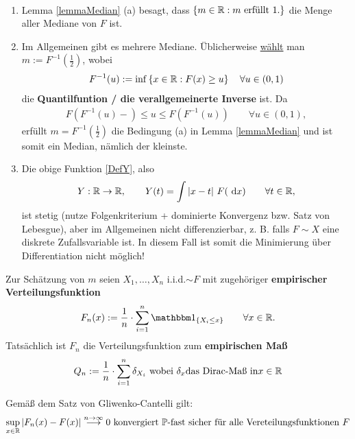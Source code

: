 \begin{bemerkungnr}\
\begin{enumerate}
\item Lemma \ref{lemmaMedian} (a) besagt, dass $\lbrace m\in\mathbb{R}: m\text{ erfüllt } 1.\rbrace$ die Menge aller Mediane von $F$ ist.
\item Im Allgemeinen gibt es mehrere Mediane. Üblicherweise \underline{wählt} man $m:=F^{-1}(\frac{1}{2})$, wobei
\begin{align*}
F^{-1}(u):=\inf\left\lbrace x\in\mathbb{R}:F(x)\geq u\right\rbrace\quad\forall u\in (0,1)
\end{align*}
die \textbf{Quantilfuntion / die verallgemeinerte Inverse} ist. Da
\begin{align*}
F\left(F^{-1}(u)-\right)\leq u\leq F\left(F^{-1}(u)\right)\qquad\forall u\in (0,1),
\end{align*}
erfüllt $m=F^{-1}\left(\frac{1}{2}\right)$ die Bedingung (a) in Lemma \ref{lemmaMedian} und ist somit ein Median, nämlich der kleinste.
\item Die obige Funktion \eqref{DefY}, also
\begin{align*}
Y:\mathbb{R}\to\mathbb{R},\qquad Y(t)=\int\limits|x-t|~F(\text{ d} x)\qquad\forall t\in\mathbb{R},
\end{align*}
ist stetig (nutze Folgenkriterium + dominierte Konvergenz bzw. Satz von Lebesgue), aber im Allgemeinen nicht differenzierbar, z. B. falls $F\sim X$ eine diskrete Zufallsvariable ist. In diesem Fall ist somit die Minimierung über Differentiation nicht möglich!
\end{enumerate}
\end{bemerkungnr}

Zur Schätzung von $m$ seien $X_1,\ldots, X_n$ i.i.d.$\sim F$ mit zugehöriger \textbf{empirischer Verteilungsfunktion}
\begin{align*}
F_n(x):=\frac{1}{n}\cdot\sum\limits_{i=1}^n\indi_{\lbrace X_i\leq x\rbrace}\qquad\forall x\in\R.
\end{align*}
Tatsächlich ist $F_n$ die Verteilungsfunktion zum \textbf{empirischen Maß}
\begin{align*}
Q_n:=\frac{1}{n}\cdot\sum\limits_{i=1}^n\delta_{X_i}\text{ wobei }\delta_x\text {das Dirac-Maß in}x\in\mathbb{R}
\end{align*}

Gemäß dem Satz von Gliwenko-Cantelli gilt:
\begin{align*}
\sup\limits_{x\in\mathbb{R}}|F_n(x)-F(x)|\stackrel{n\to\infty}{\longrightarrow}0\text{ konvergiert $\mathbb{P}$-fast sicher für alle Vereteilungsfunktionen }F
\end{align*}

